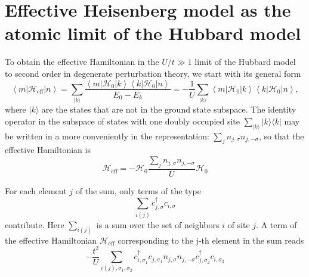 \section{Effective Heisenberg model as the atomic limit of the Hubbard model}
\label{sec:heisenberg}

To obtain the effective Hamiltonian in the $U/t \gg 1$ limit of the Hubbard model to second order in degenerate perturbation theory, we start with its general form
\begin{equation}
\left \langle m | \mathcal{H}_{\text{eff}} | n \right\rangle = \sum_{ | k \rangle} \frac{\left\langle m | \mathcal{H}_0 | k \right\rangle \left\langle k | \mathcal{H}_0 | n \right\rangle }{E_0 - E_k} =-\frac{1}{U} \sum_{ | k \rangle} \left\langle m | \mathcal{H}_0 | k \right\rangle \left\langle k | \mathcal{H}_0 | n \right\rangle ,
\end{equation}
where $| k \rangle$ are the states that are not in the ground state subspace.
The identity operator in the subspace of states with one doubly occupied site
$
\sum_{ | k \rangle} | k \rangle \langle k |
$
may be written in a more conveniently in the representation:
$
\sum_j n_{j,\sigma} n_{j, -\sigma}
$, 
so that the effective Hamiltonian is
\begin{equation}\label{eq:degPert}
\mathcal{H}_{\text{eff}} = - \mathcal{H}_0 \frac{\sum_j n_{j,\sigma} n_{j, -\sigma}}{U} \mathcal{H}_0
\end{equation}

For each element $j$ of the sum, only terms of the type 
\begin{equation*}
\sum_{i(j)} c_{j,\sigma}^\dagger c_{i,\sigma} 
\end{equation*}
contribute.
Here $\sum_{i(j)}$ is a sum over the set of neighbors $i$ of site $j$.
A term of the effective Hamiltonian $\mathcal{H}_{\text{eff}}$ corresponding to the j-th element in the sum reads
\begin{equation*}
-\frac{t^2}{U} \sum_{i(j), \sigma_1, \sigma_2 } c_{i,\sigma_1}^\dagger c_{j,\sigma_1} n_{j,\sigma} n_{j, -\sigma} c_{j, \sigma_2}^\dagger c_{i, \sigma_2}
\end{equation*}

